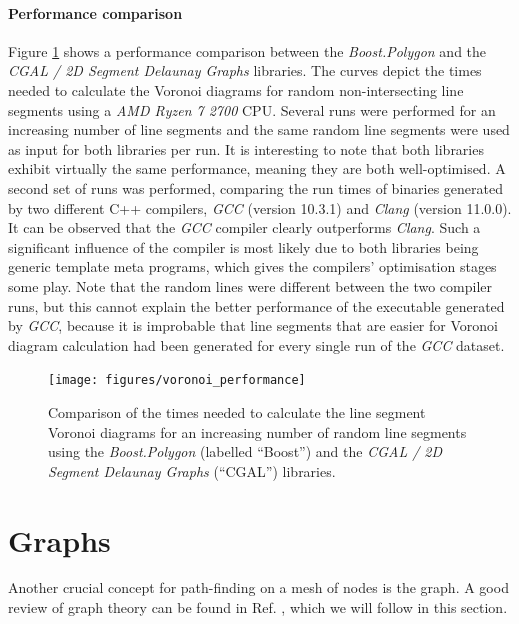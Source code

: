\paragraph{Performance comparison}
Figure \ref{fig:voro_performance} shows a performance comparison between the \textit{Boost.Polygon} and
the \textit{CGAL / 2D Segment Delaunay Graphs} libraries.
The curves depict the times needed to calculate the Voronoi diagrams for random non-intersecting line segments
using a \textit{AMD Ryzen 7 2700} CPU.
Several runs were performed for an increasing number of line segments and the same random line segments were
used as input for both libraries per run.
It is interesting to note that both libraries exhibit virtually the same performance, meaning they are both
well-optimised.
A second set of runs was performed, comparing the run times of binaries generated by two different C++ compilers,
\textit{GCC} \cite{web_gcc} (version 10.3.1) and \textit{Clang} \cite{web_clang} (version 11.0.0).
It can be observed that the \textit{GCC} compiler clearly outperforms \textit{Clang}.
Such a significant influence of the compiler is most likely due to both libraries being generic template meta
programs, which gives the compilers' optimisation stages some play.
Note that the random lines were different between the two compiler runs, but this cannot explain the better
performance of the executable generated by \textit{GCC}, because it is improbable that line segments that
are easier for Voronoi diagram calculation had been generated for every single run of the \textit{GCC} dataset.


\begin{figure}[htb]
	\begin{center}
		\texttt{[image: figures/voronoi\_performance]}
	\end{center}
	\caption[Voronoi calculation performance.]{
		Comparison of the times needed to calculate the line segment Voronoi diagrams for an increasing
		number of random line segments using the \textit{Boost.Polygon} (labelled ``Boost'') \cite{web_boost_polygon}
		and the \textit{CGAL / 2D Segment Delaunay Graphs} (``CGAL'') \cite{web_2dsegdel} libraries.
		\label{fig:voro_performance}}
\end{figure}



\section{Graphs}
\label{sec:graphs}
Another crucial concept for path-finding on a mesh of nodes is the graph.
A good review of graph theory can be found in Ref. \cite{FUH_algo_graphs_2021},
which we will follow in this section.

